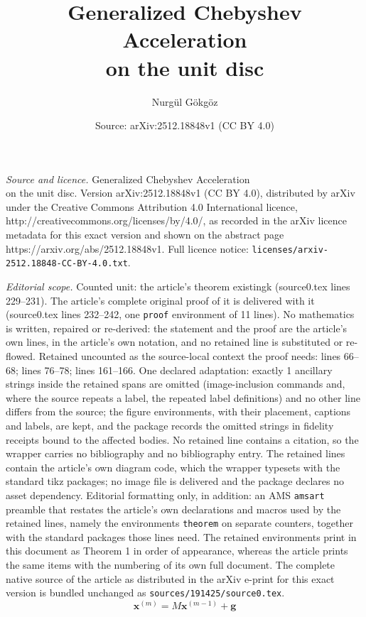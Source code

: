 \documentclass[10pt,a4paper]{amsart}
\title{Generalized Chebyshev Acceleration \\on the unit disc}
\author{Nurg\"ul G\"okg\"oz}
\date{Source: arXiv:2512.18848v1 (CC BY 4.0)}
\newcommand{\mb}{\mathbf}
\begin{document}
\maketitle

\noindent\emph{Source and licence.} Generalized Chebyshev Acceleration \\on the unit disc. Version arXiv:2512.18848v1 (CC BY 4.0), distributed by arXiv under the Creative Commons Attribution 4.0 International licence, http://creativecommons.org/licenses/by/4.0/, as recorded in the arXiv licence metadata for this exact version and shown on the abstract page https://arxiv.org/abs/2512.18848v1. Full licence notice: \texttt{licenses/arxiv-2512.18848-CC-BY-4.0.txt}.\par\smallskip

\noindent\textit{Editorial scope.} Counted unit: the article's theorem existingk (source0.tex lines 229--231). The article's complete original proof of it is delivered with it (source0.tex lines 232--242, one \texttt{proof} environment of 11 lines). No mathematics is written, repaired or re-derived: the statement and the proof are the article's own lines, in the article's own notation, and no retained line is substituted or re-flowed.  Retained uncounted as the source-local context the proof needs: lines 66--68; lines 76--78; lines 161--166.  One declared adaptation: exactly 1 ancillary strings inside the retained spans are omitted (image-inclusion commands and, where the source repeats a label, the repeated label definitions) and no other line differs from the source; the figure environments, with their placement, captions and labels, are kept, and the package records the omitted strings in fidelity receipts bound to the affected bodies.  No retained line contains a citation, so the wrapper carries no bibliography and no bibliography entry.  The retained lines contain the article's own diagram code, which the wrapper typesets with the standard tikz packages; no image file is delivered and the package declares no asset dependency.  Editorial formatting only, in addition: an AMS \texttt{amsart} preamble that restates the article's own declarations and macros used by the retained lines, namely the environments \texttt{theorem} on separate counters, together with the standard packages those lines need.  The retained environments print in this document as Theorem 1 in order of appearance, whereas the article prints the same items with the numbering of its own full document.  The complete native source of the article as distributed in the arXiv e-print for this exact version is bundled unchanged as \texttt{sources/191425/source0.tex}.
\begin{equation}\label{iter}
	\mb{x}^{(m)}=M\mb{x}^{(m-1)}+\mb{g}
\end{equation}
\end{document}
